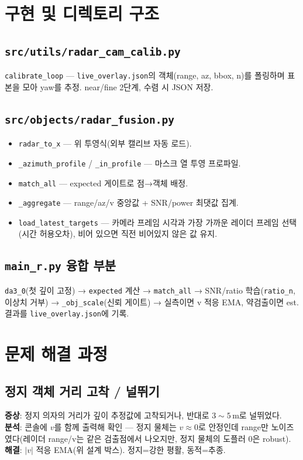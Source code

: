 \chapter{구현 및 디렉토리 구조}

\section{\texttt{src/utils/radar\_cam\_calib.py}}
\texttt{calibrate\_loop} — \texttt{live\_overlay.json}의 객체(range, az, bbox, n)를
폴링하며 표본을 모아 yaw를 추정. near/fine 2단계, 수렴 시 JSON 저장.

\section{\texttt{src/objects/radar\_fusion.py}}
\begin{itemize}
  \item \texttt{radar\_to\_x} — 위 투영식(외부 캘리브 자동 로드).
  \item \texttt{\_azimuth\_profile} / \texttt{\_in\_profile} — 마스크 열 투영 프로파일.
  \item \texttt{match\_all} — expected 게이트로 점→객체 배정.
  \item \texttt{\_aggregate} — range/az/v 중앙값 + SNR/power 최댓값 집계.
  \item \texttt{load\_latest\_targets} — 카메라 프레임 시각과 가장 가까운 레이더
        프레임 선택(시간 허용오차), 비어 있으면 직전 비어있지 않은 값 유지.
\end{itemize}

\section{\texttt{main\_r.py} 융합 부분}
\texttt{da3\_0}(첫 깊이 고정) → \texttt{expected} 계산 → \texttt{match\_all} →
SNR/ratio 학습(\texttt{ratio\_n}, 이상치 거부) → \texttt{\_obj\_scale}(신뢰 게이트) →
실측이면 v 적응 EMA, 약검출이면 est. 결과를 \texttt{live\_overlay.json}에 기록.

\chapter{문제 해결 과정}

\section{정지 객체 거리 고착 / 널뛰기}
\textbf{증상}: 정지 의자의 거리가 깊이 추정값에 고착되거나, 반대로 $3\sim5$\,m로
널뛰었다.\\
\textbf{분석}: 콘솔에 $v$를 함께 출력해 확인 — 정지 물체는 $v\approx0$로 안정인데
range만 노이즈였다(레이더 range/v는 같은 검출점에서 나오지만, 정지 물체의
도플러 0은 robust).\\
\textbf{해결}: $|v|$ 적응 EMA(위 설계 박스). 정지=강한 평활, 동적=추종.


